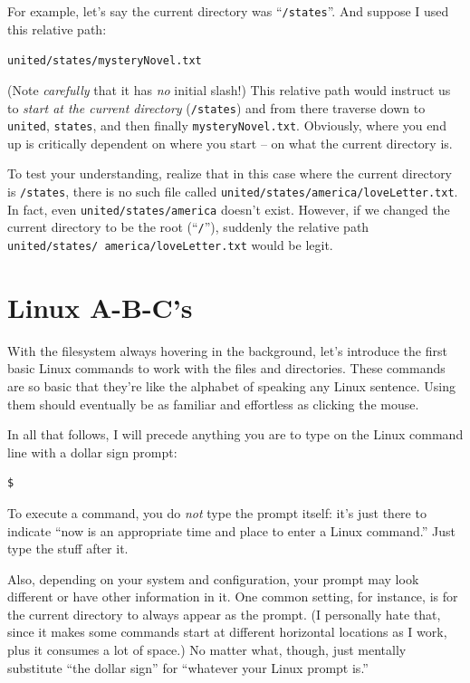 For example, let's say the current directory was ``\texttt{/states}''. And
suppose I used this relative path:

\quad\quad \texttt{united/states/mysteryNovel.txt}

(Note \textit{carefully} that it has \textit{no} initial slash!) This relative
path would instruct us to \textit{start at the current directory}
(\texttt{/states}) and from there traverse down to \texttt{united},
\texttt{states}, and then finally \texttt{mysteryNovel.txt}. Obviously, where
you end up is critically dependent on where you start -- on what the current
directory is.

To test your understanding, realize that in this case where the current
directory is \texttt{/states}, there is no such file called
\texttt{united/states/america/loveLetter.txt}. In fact, even 
\texttt{united/states/america} doesn't exist. However, if we changed the
current directory to be the root (``\texttt{/}''), suddenly the relative path
\texttt{united/states/ america/loveLetter.txt} would be legit.

\section{Linux A-B-C's}

With the filesystem always hovering in the background, let's introduce the
first basic Linux commands to work with the files and directories. These
commands are so basic that they're like the alphabet of speaking any Linux
sentence. Using them should eventually be as familiar and effortless as
clicking the mouse.

In all that follows, I will precede anything you are to type on the Linux
command line with a dollar sign prompt:

\begin{verbatim}
$
\end{verbatim}

To execute a command, you do \textit{not} type the prompt itself: it's just
there to indicate ``now is an appropriate time and place to enter a Linux
command.'' Just type the stuff after it.

Also, depending on your system and configuration, your prompt may look
different or have other information in it. One common setting, for instance,
is for the current directory to always appear as the prompt. (I personally
hate that, since it makes some commands start at different horizontal
locations as I work, plus it consumes a lot of space.) No matter what, though,
just mentally substitute ``the dollar sign'' for ``whatever your Linux prompt
is.''

